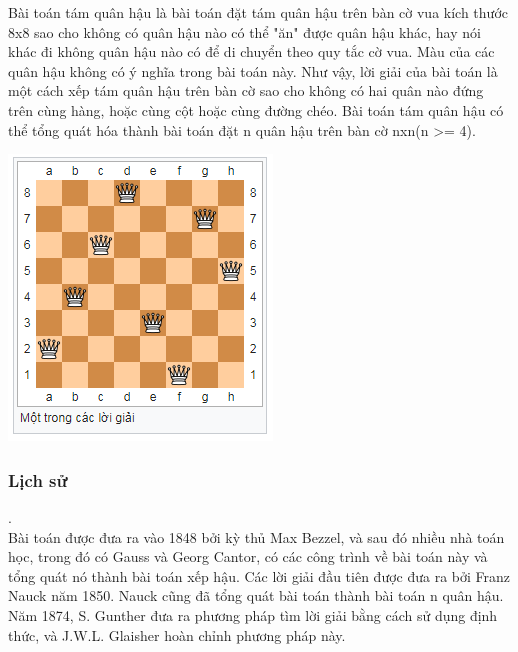 \documentclass{hcmutarticle}
\begin{document}
Bài toán tám quân hậu là bài toán đặt tám quân hậu trên bàn cờ vua kích thước 8x8 sao cho không có quân hậu nào có thể "ăn" được quân hậu khác, hay nói khác đi không quân hậu nào có để di chuyển theo quy tắc cờ vua. Màu của các quân hậu không có ý nghĩa trong bài toán này. Như vậy, lời giải của bài toán là một cách xếp tám quân hậu trên bàn cờ sao cho không có hai quân nào đứng trên cùng hàng, hoặc cùng cột hoặc cùng đường chéo. Bài toán tám quân hậu có thể tổng quát hóa thành bài toán đặt n quân hậu trên bàn cờ nxn(n >= 4).


\begin{center}
\includegraphics[scale=1]{image/hinhboard8x8}\\[1cm]
\end{center}

\subsubsection{Lịch sử}.
\\
Bài toán được đưa ra vào 1848 bởi kỳ thủ Max Bezzel, và sau đó nhiều nhà toán học, trong đó có Gauss và Georg Cantor, có các công trình về bài toán này và tổng quát nó thành bài toán xếp hậu. Các lời giải đầu tiên được đưa ra bởi Franz Nauck năm 1850. Nauck cũng đã tổng quát bài toán thành bài toán n quân hậu. Năm 1874, S. Gunther đưa ra phương pháp tìm lời giải bằng cách sử dụng định thức, và J.W.L. Glaisher hoàn chỉnh phương pháp này.
\end{document}
